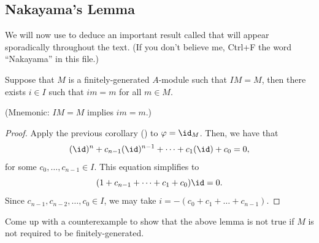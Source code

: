 \subsection{Nakayama's Lemma}
We will now use 
to deduce an important result called 
that will appear sporadically throughout the text.
(If you don't believe me, Ctrl+F the word ``Nakayama''
in this file.)
\begin{lemma}
    Suppose that $M$ is a finitely-generated $A$-module
    such that $IM=M$, then
    there exists $i\in I$ such that $im=m$
    for all $m\in M$.

    (Mnemonic: $IM=M$ implies $im=m$.)
\end{lemma}
\begin{proof}
    Apply the previous corollary () to $\varphi = \id_M$.
    Then, we have that
    $$(\id)^n + c_{n-1}(\id)^{n-1} + \dots + c_1(\id) + c_0 = 0,$$
    for some $c_0,\dots,c_{n-1}\in I$. This equation simplifies to
   $$(1+c_{n-1} +\dots+c_1+c_0)\id = 0.$$
   Since $c_{n-1},c_{n-2},\dots,c_0\in I$, we may take
   $i = -(c_0+c_1+\dots+c_{n-1})$.
\end{proof}
\begin{exercise}
Come up with a counterexample to show that 
the above lemma is not true if $M$ 
is not required to be finitely-generated.
\end{exercise}

